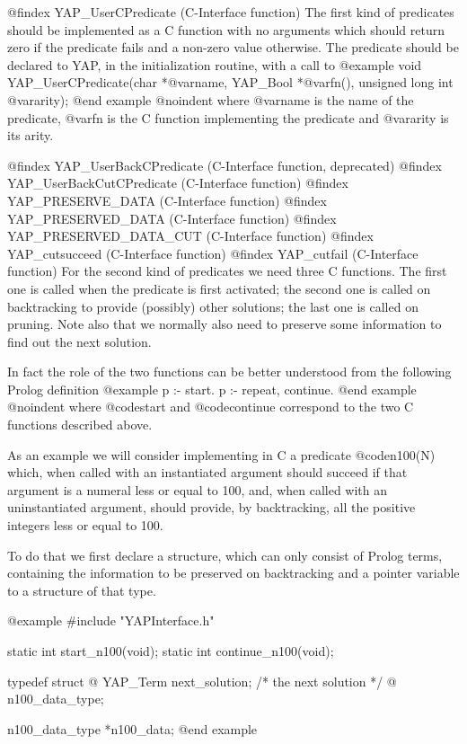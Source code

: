 {{{{{{{{@findex YAP_UserCPredicate (C-Interface function)
The first kind of predicates should be implemented as a C function with
no arguments which should return zero if the predicate fails and a
non-zero value otherwise. The predicate should be declared to
YAP, in the initialization routine, with a call to
@example
      void YAP_UserCPredicate(char *@var{name}, YAP_Bool *@var{fn}(), unsigned long int @var{arity});
@end example
@noindent
where @var{name} is the name of the predicate, @var{fn} is the C function
implementing the predicate and @var{arity} is its arity.

@findex YAP_UserBackCPredicate (C-Interface function, deprecated)
@findex YAP_UserBackCutCPredicate (C-Interface function)
@findex YAP_PRESERVE_DATA (C-Interface function)
@findex YAP_PRESERVED_DATA (C-Interface function)
@findex YAP_PRESERVED_DATA_CUT (C-Interface function)
@findex YAP_cutsucceed (C-Interface function)
@findex YAP_cutfail (C-Interface function)
For the second kind of predicates we need three C functions. The first one
 is called when the predicate is first activated; the second one
is called on backtracking to provide (possibly) other solutions; the
 last one is called on pruning. Note
also that we normally also need to preserve some information to find out
the next solution.

In fact the role of the two functions can be better understood from the
following Prolog definition
@example
       p :- start.
       p :- repeat,
                continue.
@end example
@noindent
where @code{start} and @code{continue} correspond to the two C functions
described above.


As an example we will consider implementing in C a predicate @code{n100(N)}
which, when called with an instantiated argument should succeed if that
argument is a numeral less or equal to 100, and, when called with an
uninstantiated argument, should provide, by backtracking, all the positive
integers less or equal to 100.

   To do that we first declare a structure, which can only consist
of Prolog terms, containing the information to be preserved on backtracking
and a pointer variable to a structure of that type.

@example
#include "YAPInterface.h"

static int start_n100(void);
static int continue_n100(void);

typedef struct @{
    YAP_Term next_solution;  /* the next solution */
   @} n100_data_type;

n100_data_type *n100_data;
@end example

}}}}}}}}
